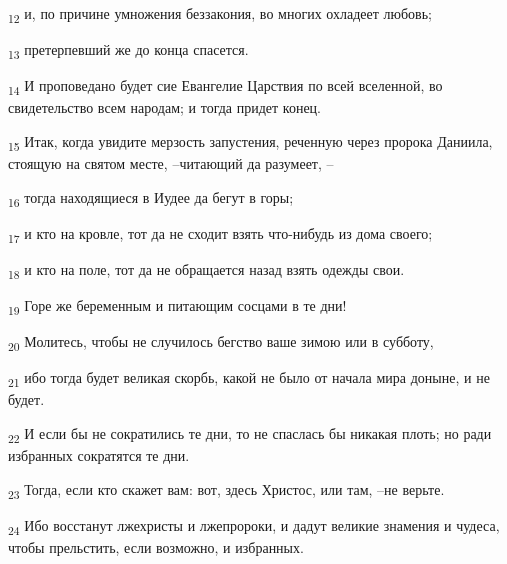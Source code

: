 \begin{tcolorbox}
\textsubscript{12} и, по причине умножения беззакония, во многих охладеет любовь;
\end{tcolorbox}
\begin{tcolorbox}
\textsubscript{13} претерпевший же до конца спасется.
\end{tcolorbox}
\begin{tcolorbox}
\textsubscript{14} И проповедано будет сие Евангелие Царствия по всей вселенной, во свидетельство всем народам; и тогда придет конец.
\end{tcolorbox}
\begin{tcolorbox}
\textsubscript{15} Итак, когда увидите мерзость запустения, реченную через пророка Даниила, стоящую на святом месте, --читающий да разумеет, --
\end{tcolorbox}
\begin{tcolorbox}
\textsubscript{16} тогда находящиеся в Иудее да бегут в горы;
\end{tcolorbox}
\begin{tcolorbox}
\textsubscript{17} и кто на кровле, тот да не сходит взять что-нибудь из дома своего;
\end{tcolorbox}
\begin{tcolorbox}
\textsubscript{18} и кто на поле, тот да не обращается назад взять одежды свои.
\end{tcolorbox}
\begin{tcolorbox}
\textsubscript{19} Горе же беременным и питающим сосцами в те дни!
\end{tcolorbox}
\begin{tcolorbox}
\textsubscript{20} Молитесь, чтобы не случилось бегство ваше зимою или в субботу,
\end{tcolorbox}
\begin{tcolorbox}
\textsubscript{21} ибо тогда будет великая скорбь, какой не было от начала мира доныне, и не будет.
\end{tcolorbox}
\begin{tcolorbox}
\textsubscript{22} И если бы не сократились те дни, то не спаслась бы никакая плоть; но ради избранных сократятся те дни.
\end{tcolorbox}
\begin{tcolorbox}
\textsubscript{23} Тогда, если кто скажет вам: вот, здесь Христос, или там, --не верьте.
\end{tcolorbox}
\begin{tcolorbox}
\textsubscript{24} Ибо восстанут лжехристы и лжепророки, и дадут великие знамения и чудеса, чтобы прельстить, если возможно, и избранных.
\end{tcolorbox}
